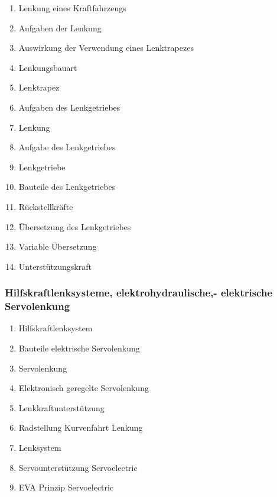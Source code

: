 \begin{enumerate}
\item
  Lenkung eines Kraftfahrzeugs\\
\item
  Aufgaben der Lenkung\\
\item
  Auswirkung der Verwendung eines Lenktrapezes\\
\item
  Lenkungsbauart\\
\item
  Lenktrapez\\
\item
  Aufgaben des Lenkgetriebes\\
\item
  Lenkung\\
\item
  Aufgabe des Lenkgetriebes\\
\item
  Lenkgetriebe\\
\item
  Bauteile des Lenkgetriebes\\
\item
  Rückstellkräfte\\
\item
  Übersetzung des Lenkgetriebes\\
\item
  Variable Übersetzung\\
\item
  Unterstützungskraft
\end{enumerate}

\subsubsection{Hilfskraftlenksysteme, elektrohydraulische,- elektrische
Servolenkung}\label{hilfskraftlenksysteme-elektrohydraulische--elektrische-servolenkung}

\begin{enumerate}
\item
  Hilfskraftlenksystem\\
\item
  Bauteile elektrische Servolenkung\\
\item
  Servolenkung\\
\item
  Elektronisch geregelte Servolenkung\\
\item
  Lenkkraftunterstützung\\
\item
  Radstellung Kurvenfahrt Lenkung\\
\item
  Lenksystem\\
\item
  Servounterstützung Servoelectric\\
\item
  EVA Prinzip Servoelectric
\end{enumerate}

